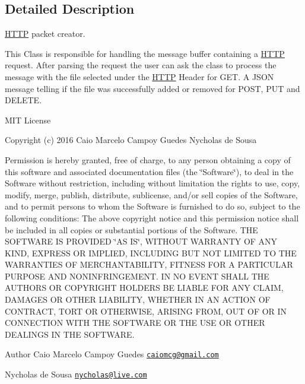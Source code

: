 \subsection{Detailed Description}
\hyperlink{class_h_t_t_p}{H\+T\+TP} packet creator. 

This Class is responsible for handling the message buffer containing a \hyperlink{class_h_t_t_p}{H\+T\+TP} request. After parsing the request the user can ask the class to process the message with the file selected under the \hyperlink{class_h_t_t_p}{H\+T\+TP} Header for G\+ET. A J\+S\+ON message telling if the file was successfully added or removed for P\+O\+ST, P\+UT and D\+E\+L\+E\+TE.

M\+IT License

Copyright (c) 2016 Caio Marcelo Campoy Guedes Nycholas de Sousa

Permission is hereby granted, free of charge, to any person obtaining a copy of this software and associated documentation files (the \char`\"{}\+Software\char`\"{}), to deal in the Software without restriction, including without limitation the rights to use, copy, modify, merge, publish, distribute, sublicense, and/or sell copies of the Software, and to permit persons to whom the Software is furnished to do so, subject to the following conditions\+: The above copyright notice and this permission notice shall be included in all copies or substantial portions of the Software. T\+HE S\+O\+F\+T\+W\+A\+RE IS P\+R\+O\+V\+I\+D\+ED \char`\"{}\+A\+S I\+S\char`\"{}, W\+I\+T\+H\+O\+UT W\+A\+R\+R\+A\+N\+TY OF A\+NY K\+I\+ND, E\+X\+P\+R\+E\+SS OR I\+M\+P\+L\+I\+ED, I\+N\+C\+L\+U\+D\+I\+NG B\+UT N\+OT L\+I\+M\+I\+T\+ED TO T\+HE W\+A\+R\+R\+A\+N\+T\+I\+ES OF M\+E\+R\+C\+H\+A\+N\+T\+A\+B\+I\+L\+I\+TY, F\+I\+T\+N\+E\+SS F\+OR A P\+A\+R\+T\+I\+C\+U\+L\+AR P\+U\+R\+P\+O\+SE A\+ND N\+O\+N\+I\+N\+F\+R\+I\+N\+G\+E\+M\+E\+NT. IN NO E\+V\+E\+NT S\+H\+A\+LL T\+HE A\+U\+T\+H\+O\+RS OR C\+O\+P\+Y\+R\+I\+G\+HT H\+O\+L\+D\+E\+RS BE L\+I\+A\+B\+LE F\+OR A\+NY C\+L\+A\+IM, D\+A\+M\+A\+G\+ES OR O\+T\+H\+ER L\+I\+A\+B\+I\+L\+I\+TY, W\+H\+E\+T\+H\+ER IN AN A\+C\+T\+I\+ON OF C\+O\+N\+T\+R\+A\+CT, T\+O\+RT OR O\+T\+H\+E\+R\+W\+I\+SE, A\+R\+I\+S\+I\+NG F\+R\+OM, O\+UT OF OR IN C\+O\+N\+N\+E\+C\+T\+I\+ON W\+I\+TH T\+HE S\+O\+F\+T\+W\+A\+RE OR T\+HE U\+SE OR O\+T\+H\+ER D\+E\+A\+L\+I\+N\+GS IN T\+HE S\+O\+F\+T\+W\+A\+RE.

\begin{DoxyAuthor}{Author}
Caio Marcelo Campoy Guedes \href{mailto:caiomcg@gmail.com}{\tt caiomcg@gmail.\+com} 

Nycholas de Sousa \href{mailto:nycholas@live.com}{\tt nycholas@live.\+com} 
\end{DoxyAuthor}


